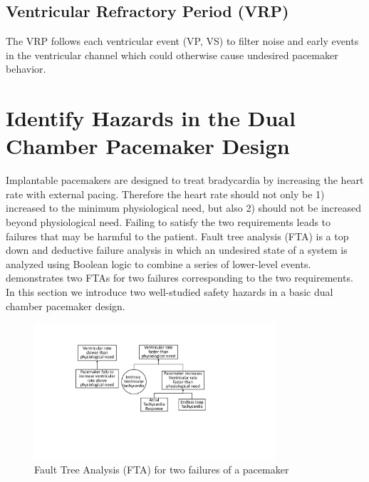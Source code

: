 \subsection{Ventricular Refractory Period (VRP)}
The VRP follows each ventricular event \textsf{(VP, VS)} to filter noise and early events in the ventricular channel which could otherwise cause undesired pacemaker behavior. 

\section{Identify Hazards in the Dual Chamber Pacemaker Design}
Implantable pacemakers are designed to treat bradycardia by increasing the heart rate with external pacing. 
Therefore the heart rate should not only be 1) increased to the minimum physiological need, but also 2) should not be increased beyond physiological need. 
Failing to satisfy the two requirements leads to failures that may be harmful to the patient.
Fault tree analysis (FTA) is a top down and deductive failure analysis in which an undesired state of a system is analyzed using Boolean logic to combine a series of lower-level events.
 demonstrates two FTAs for two failures corresponding to the two requirements. 
In this section we introduce two well-studied safety hazards in a basic dual chamber pacemaker design.
\begin{figure}[!t]
		\centering
		\includegraphics[width=0.8\textwidth]{figs/risk_requirements.pdf}
		\caption{\small Fault Tree Analysis (FTA) for two failures of a pacemaker}
		\label{fig:risk_req}
\end{figure}



